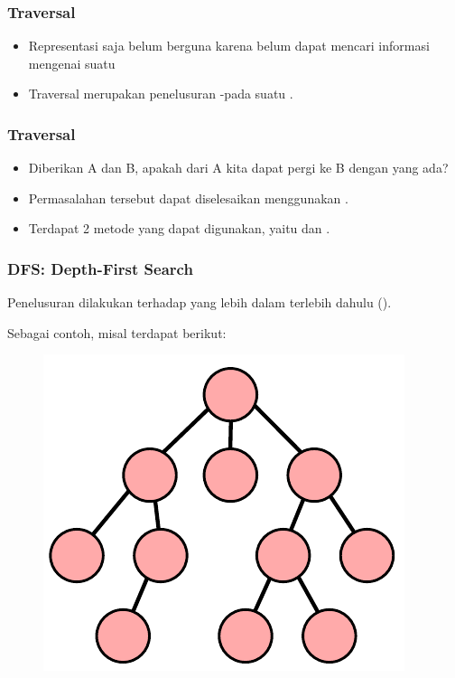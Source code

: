 \begin{frame}
\frametitle{\fGraph Traversal}
\begin{itemize}
  \item Representasi \fGraph saja belum berguna karena belum dapat mencari informasi mengenai suatu \fgraph
  \item \alert{\fGraph Traversal} merupakan penelusuran \fnode-\fnode pada suatu \fgraph.
\end{itemize}
\end{frame}

\begin{frame}
\frametitle{\fGraph Traversal}
\begin{itemize}
  \item Diberikan \fnode A dan \fnode B, apakah dari \fnode A kita dapat pergi ke \fnode B dengan \fedge yang ada?
  \item Permasalahan tersebut dapat diselesaikan menggunakan \fgraphtraversal.
  \newline
  \item Terdapat 2 metode yang dapat digunakan, yaitu  dan .
\end{itemize}
\end{frame}

\begin{frame}
\frametitle{DFS: Depth-First Search}
Penelusuran dilakukan terhadap \fnode yang lebih dalam terlebih dahulu (). 

Sebagai contoh, misal terdapat \fgraph berikut:

\begin{figure}
  \centering
  \includegraphics[width=4 cm]{asset/plain.pdf}
\end{figure}
\end{frame}

